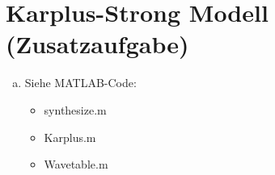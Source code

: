 \chapter{Karplus-Strong Modell (Zusatzaufgabe)}


\begin{enumerate}[a)]
\item
Siehe MATLAB-Code:
\begin{itemize}
\item
synthesize.m
\item
Karplus.m
\item
Wavetable.m
\end{itemize}


\end{enumerate}
